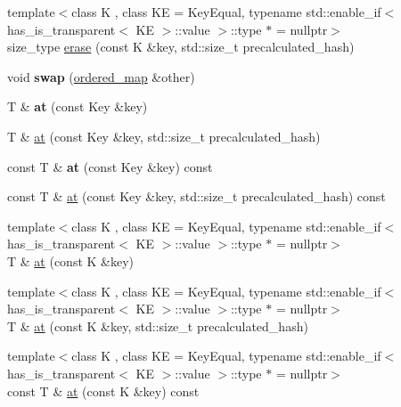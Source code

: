 \begin{DoxyCompactItemize}
\item 
{\footnotesize template$<$class K , class KE  = Key\+Equal, typename std\+::enable\+\_\+if$<$ has\+\_\+is\+\_\+transparent$<$ K\+E $>$\+::value $>$\+::type $\ast$  = nullptr$>$ }\\size\+\_\+type \mbox{\hyperlink{classtsl_1_1ordered__map_a11b416d92cc924f0ad6c07b308914543}{erase}} (const K \&key, std\+::size\+\_\+t precalculated\+\_\+hash)
\item 
\mbox{\label{classtsl_1_1ordered__map_a1257d7d1d3ae9d3da2c5e7d84f369b3f}} 
void {\bfseries swap} (\mbox{\hyperlink{classtsl_1_1ordered__map}{ordered\+\_\+map}} \&other)
\item 
\mbox{\label{classtsl_1_1ordered__map_a6773df9df89f4c559ee99b3fff11b15a}} 
T \& {\bfseries at} (const Key \&key)
\item 
T \& \mbox{\hyperlink{classtsl_1_1ordered__map_a7154dccbdf1947e72fa56072e0155f81}{at}} (const Key \&key, std\+::size\+\_\+t precalculated\+\_\+hash)
\item 
\mbox{\label{classtsl_1_1ordered__map_ad98755d2787336d3a144ddab445c4395}} 
const T \& {\bfseries at} (const Key \&key) const
\item 
const T \& \mbox{\hyperlink{classtsl_1_1ordered__map_a678118593d6aba4f173a65c83859d8f6}{at}} (const Key \&key, std\+::size\+\_\+t precalculated\+\_\+hash) const
\item 
{\footnotesize template$<$class K , class KE  = Key\+Equal, typename std\+::enable\+\_\+if$<$ has\+\_\+is\+\_\+transparent$<$ K\+E $>$\+::value $>$\+::type $\ast$  = nullptr$>$ }\\T \& \mbox{\hyperlink{classtsl_1_1ordered__map_a9ac22985f53d62c53617932cd54493cf}{at}} (const K \&key)
\item 
{\footnotesize template$<$class K , class KE  = Key\+Equal, typename std\+::enable\+\_\+if$<$ has\+\_\+is\+\_\+transparent$<$ K\+E $>$\+::value $>$\+::type $\ast$  = nullptr$>$ }\\T \& \mbox{\hyperlink{classtsl_1_1ordered__map_a478220509105133bdf3829887a16ea96}{at}} (const K \&key, std\+::size\+\_\+t precalculated\+\_\+hash)
\item 
{\footnotesize template$<$class K , class KE  = Key\+Equal, typename std\+::enable\+\_\+if$<$ has\+\_\+is\+\_\+transparent$<$ K\+E $>$\+::value $>$\+::type $\ast$  = nullptr$>$ }\\const T \& \mbox{\hyperlink{classtsl_1_1ordered__map_a023f7b34ab4b27c444a03fa0a41abfa6}{at}} (const K \&key) const

\end{DoxyCompactItemize}
